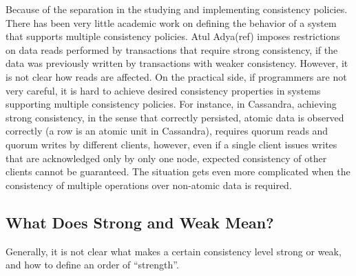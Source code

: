 Because of the separation in the studying and implementing consistency policies.
There has been very little academic work on defining the behavior of a system
that supports multiple consistency policies. Atul Adya(ref) imposes restrictions
on data reads performed by transactions that require strong consistency, if the data was
previously written by transactions with weaker consistency. However, it is not clear
how reads are affected. On the practical side, if programmers are not very
careful, it is hard to achieve desired consistency properties in systems
supporting multiple consistency policies. For instance, in Cassandra, achieving
strong consistency, in the sense that correctly persisted, atomic data is
observed correctly (a row is an atomic unit in Cassandra), requires quorum reads
and quorum writes by different clients, however, even if a single client issues
writes that are acknowledged only by only one node, expected consistency of
other clients cannot be guaranteed. The situation gets even more complicated
when the consistency of multiple operations over non-atomic data is required.

\subsection{What Does Strong and Weak Mean?}
Generally, it is not clear what makes a certain consistency level strong or
weak, and how to define an order of ``strength''.







